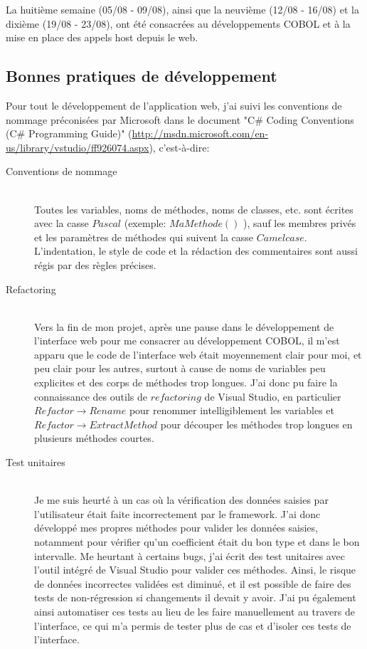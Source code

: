 \documentclass[a4paper,french,12pt]{article}
\begin{document}
		La huitième semaine (05/08 - 09/08), ainsi que la neuvième (12/08 - 16/08) et la dixième (19/08 - 23/08), ont été consacrées au développements COBOL 
		et à la mise en place des appels host depuis le web.\\ 
	
	\subsection{Bonnes pratiques de développement}
			Pour tout le développement de l'application web, j'ai suivi les conventions de nommage préconisées par Microsoft dans le document
			"C\# Coding Conventions (C\# Programming Guide)" (\url{http://msdn.microsoft.com/en-us/library/vstudio/ff926074.aspx}), c'est-à-dire:
			\begin{description} 
				\item[Conventions de nommage] \hfill \\
					Toutes les variables, noms de méthodes, noms de classes, etc. sont écrites avec la casse $Pascal$ (exemple: $MaMethode()$ ), sauf les membres privés et les paramètres de méthodes qui suivent
					la casse $Camelcase$.
					L'indentation, le style de code et la rédaction des commentaires sont aussi régis par des règles précises.
				\item[Refactoring] \hfill \\
					Vers la fin de mon projet, après une pause dans le développement de l'interface web pour me consacrer au développement COBOL, il m'est apparu que le code de l'interface web était moyennement clair pour moi, 
					et peu clair pour les autres, surtout à cause de noms de variables peu explicites et des corps de méthodes trop longues.
					J'ai donc pu faire la connaissance des outils de $refactoring$ de Visual Studio, en particulier $Refactor \to Rename$ pour renommer intelligiblement les variables
					et $Refactor \to Extract Method$ pour découper les méthodes trop longues en plusieurs méthodes courtes.
				\item[Test unitaires]  \hfill \\
					Je me suis heurté à un cas où la vérification des données saisies par l'utilisateur était faite incorrectement par le framework. J'ai donc développé mes propres méthodes pour valider les données saisies,
					notamment pour vérifier qu'un coefficient était du bon type et dans le bon intervalle. Me heurtant à certains bugs, j'ai écrit des test unitaires avec l'outil intégré de Visual Studio 
					pour valider ces méthodes. Ainsi, le risque de données incorrectes validées est diminué, et il est possible de faire des tests de non-régression si changements il devait y avoir.
					J'ai pu également ainsi automatiser ces tests au lieu de les faire manuellement au travers de l'interface, ce qui m'a permis de tester plus de cas et d'isoler ces tests de l'interface.
			\end{description}
	
\end{document}

